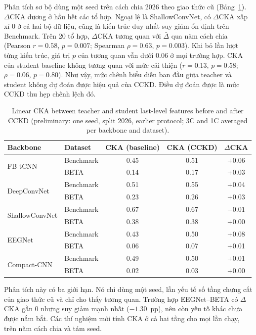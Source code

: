 \documentclass[10pt]{article} %
\begin{document}
Phân tích sơ bộ dùng một seed trên cách chia 2026 theo giao thức cũ (Bảng~\ref{tab:cka}). $\Delta$CKA dương ở hầu hết các tổ hợp. Ngoại lệ là ShallowConvNet, có $\Delta$CKA xấp xỉ 0 ở cả hai bộ dữ liệu, cũng là kiến trúc duy nhất suy giảm ổn định trên Benchmark. Trên 20 tổ hợp, $\Delta$CKA tương quan với $\bar\Delta$ qua năm cách chia (Pearson $r=0.58$, $p=0.007$; Spearman $\rho=0.63$, $p=0.003$). Khi bỏ lần lượt từng kiến trúc, giá trị $p$ của tương quan vẫn dưới $0.06$ ở mọi trường hợp. CKA của student baseline không tương quan với mức cải thiện ($r=0.13$, $p=0.58$; $\rho=0.06$, $p=0.80$). Như vậy, mức chênh biểu diễn ban đầu giữa teacher và student không dự đoán được hiệu quả của CCKD. Điều dự đoán được là mức CCKD thu hẹp chênh lệch đó.

\begin{table}[h]
\caption{Linear CKA between teacher and student last-level features before and after CCKD (preliminary: one seed, split 2026, earlier protocol; 3C and 1C averaged per backbone and dataset).}
\label{tab:cka}
\begin{center}
\begin{tabular}{llccc}
\toprule
Backbone & Dataset & CKA (baseline) & CKA (CCKD) & $\Delta$CKA \\
\midrule
\multirow{2}{*}{FB-tCNN} & Benchmark & 0.45 & 0.51 & +0.06 \\
 & BETA & 0.14 & 0.17 & +0.03 \\
\multirow{2}{*}{DeepConvNet} & Benchmark & 0.51 & 0.55 & +0.04 \\
 & BETA & 0.23 & 0.26 & +0.03 \\
\multirow{2}{*}{ShallowConvNet} & Benchmark & 0.67 & 0.67 & $-0.01$ \\
 & BETA & 0.38 & 0.38 & +0.00 \\
\multirow{2}{*}{EEGNet} & Benchmark & 0.43 & 0.50 & +0.08 \\
 & BETA & 0.06 & 0.07 & +0.01 \\
\multirow{2}{*}{Compact-CNN} & Benchmark & 0.49 & 0.50 & +0.01 \\
 & BETA & 0.02 & 0.03 & +0.00 \\
\bottomrule
\end{tabular}
\end{center}
\end{table}

Phân tích này có ba giới hạn. Nó chỉ dùng một seed, lẫn yếu tố số tầng chưng cất của giao thức cũ và chỉ cho thấy tương quan. Trường hợp EEGNet--BETA có $\Delta$CKA gần 0 nhưng suy giảm mạnh nhất ($-1.30$~pp), nên còn yếu tố khác chưa được nắm bắt. Các thí nghiệm mới tính CKA ở cả hai tầng cho mọi lần chạy, trên năm cách chia và tám seed.
\end{document}
